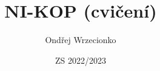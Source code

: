 \documentclass{article}
\title{NI-KOP (cvičení)}
\author{Ondřej Wrzecionko}
\date{ZS 2022/2023}
\begin{document}
\maketitle

\renewcommand{\contentsname}{Obsah}
\tableofcontents

     
\end{document}
